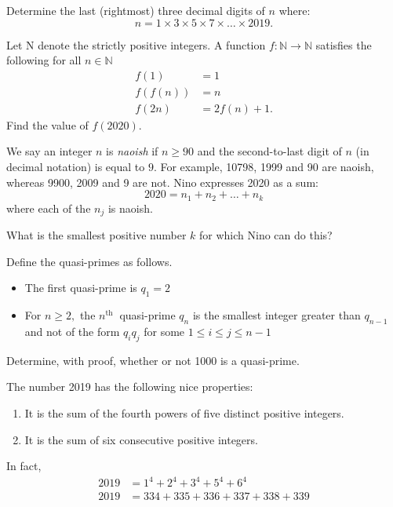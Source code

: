 \documentclass{pset}
\begin{document}
\begin{problems}

\begin{problem}[IrMO 2020 Q8]
    Determine the last (rightmost) three decimal digits of $n$ where:
$$
n=1 \times 3 \times 5 \times 7 \times \ldots \times 2019.
$$
\end{problem}

    \begin{problem}[IrMO 2020 Q7]
        Let $\mathrm{N}$ denote the strictly positive integers. $\mathrm{A}$ function $f: \mathbb{N} \rightarrow \mathbb{N}$ satisfies the following for all $n \in \mathbb{N}$
\begin{align*}
f(1) &=1 \\
f(f(n)) &=n \\
f(2 n) &=2 f(n)+1.
\end{align*}
Find the value of $f(2020)$.
    \end{problem}

    \begin{problem}[IrMO 2020 Q1]
        We say an integer $n$ is \emph{naoish} if $n \geq 90$ and the second-to-last digit of $n$ (in decimal notation) is equal to $9 .$ For example, 10798, 1999 and 90 are naoish, whereas 9900, 2009 and 9 are not. Nino expresses 2020 as a sum:
$$
2020=n_{1}+n_{2}+\ldots+n_{k}
$$
where each of the $n_{j}$ is naoish.

What is the smallest positive number $k$ for which Nino can do this?
    \end{problem}

    \begin{problem}[IrMO 2019 Q1]
        Define the quasi-primes as follows.
        \begin{itemize}
            \item The first quasi-prime is \(q_{1}=2\)
\item For \(n \geq 2,\) the \(n^{\text {th }}\) quasi-prime \(q_{n}\) is the smallest integer greater than \(q_{n-1}\) and
not of the form \(q_{i} q_{j}\) for some \(1 \leq i \leq j \leq n-1\) 
        \end{itemize}

Determine, with proof, whether or not 1000 is a quasi-prime.
    \end{problem}

\begin{problem}[IrMO 2019 Q6]
    The number 2019 has the following nice properties:
    \begin{enumerate}
    \item It is the sum of the fourth powers of five distinct positive integers.
    \item It is the sum of six consecutive positive integers.
    \end{enumerate}
    In fact,
    \begin{align*}
    2019&=1^{4}+2^{4}+3^{4}+5^{4}+6^{4} \\
    2019&=334+335+336+337+338+339
    \end{align*}


\end{problem}
\end{problems}
\end{document}
